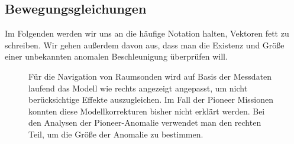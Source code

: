 
\subsection{Bewegungsgleichungen}\label{berechnungen}
Im Folgenden werden wir uns an die häufige Notation halten, Vektoren fett zu schreiben. Wir gehen außerdem davon aus, dass man die Existenz und Größe einer unbekannten anomalen Beschleunigung überprüfen will.


\begin{figure}[htnb]
\begin{center}
\noindent    
{}
\end{center}
\vskip -10pt
  \caption{Für die Navigation von Raumsonden wird auf Basis der Messdaten laufend das Modell wie rechts angezeigt angepasst, um nicht berücksichtige Effekte auszugleichen. Im Fall der Pioneer Missionen konnten diese Modellkorrekturen bisher nicht erklärt werden. Bei den Analysen der Pioneer-Anomalie verwendet man den rechten Teil, um die Größe der Anomalie zu bestimmen.\cite{Turyshev2010}}\label{fig:nav}
\end{figure} 

